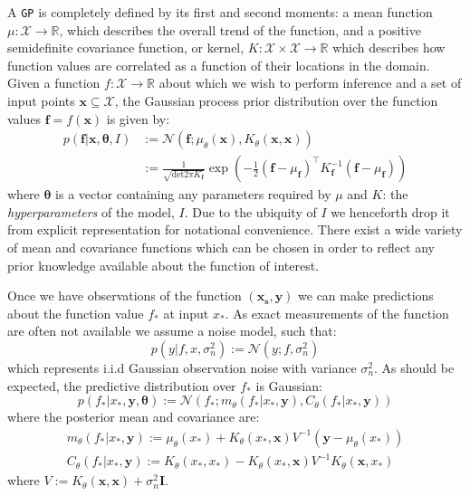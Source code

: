 \documentclass{article}
\newcommand{\xd}{\mathbf{x}}
\newcommand{\yd}{\mathbf{y}}
\begin{document}
A \verb"GP" is completely defined by its first and second moments: a mean function $\mu : \mathcal{X} \rightarrow \mathbb{R}$, which describes the overall trend of the function, and a positive semidefinite covariance function, or kernel, $K : \mathcal{X} \times \mathcal{X} \rightarrow \mathbb{R}$ which describes how function values are correlated as a function of their locations in the domain. Given a function $f : \mathcal{X} \rightarrow \mathbb{R}$ about which we wish to perform inference and a set of input points $\mathbf{x} \subseteq \mathcal{X}$, the Gaussian process prior distribution over the function values $\mathbf{f} = f(\mathbf{x})$ is given by:
\begin{align}
p(\mathbf{f} | \mathbf{x},\bm{\theta},I) &:= \mathcal{N}\left( \mathbf{f};\mu_\theta(\mathbf{x}),K_\theta(\mathbf{x},\mathbf{x}) \right) \nonumber \\
&:= \frac{1}{\sqrt{\mathrm{det} 2 \pi K_{\mathbf{f}}} } \exp \left( - \frac{1}{2} (\mathbf{f}-\mu_{\mathbf{f}})^\top K_\mathbf{f}^{-1} (\mathbf{f}-\mu_{\mathbf{f}})  \right)
\end{align}
where $\bm{\theta}$ is a vector containing any parameters required by $\mu$ and $K$: the \emph{hyperparameters} of the model, $I$. Due to the ubiquity of $I$ we henceforth drop it from explicit representation for notational convenience. %
There exist a wide variety of mean and covariance functions which can be chosen in order to reflect any prior knowledge available about the function of interest. 

Once we have observations of the function $(\mathbf{x_s},\yd)$ we can make predictions about the function value $f_*$ at input $x_*$. As exact measurements of the function are often not available we assume a noise model, such that:
\begin{equation}\label{obsnoise}
p(y | f, x, \sigma_n^2) := \mathcal{N}(y; f, \sigma_n^2)
\end{equation} 
which represents i.i.d Gaussian observation noise with variance $\sigma_n^2$. As should be expected, the predictive distribution over $f_*$ is Gaussian:
\begin{equation}\label{posteriorpred}
p(f_* | x_*, \yd,\bm{\theta}) := \mathcal{N} ( f_* ; m_\theta(f_* | x_*, \yd), C_\theta(f_* | x_*, \yd))
\end{equation}
where the posterior mean and covariance are:
\begin{align}
m_\theta(f_* | x_*, \yd) := \mu_\theta(x_*) + K_\theta(x_*,\xd)V^{-1}(\yd - \mu_\theta(x_*))\\
C_\theta(f_* | x_*, \yd) := K_\theta(x_*,x_*) - K_\theta(x_*,\xd)V^{-1}K_\theta(\xd,x_*)
\end{align}
where $V := K_\theta(\xd,\xd) + \sigma_n^2\mathbf{I}$.
\end{document}
